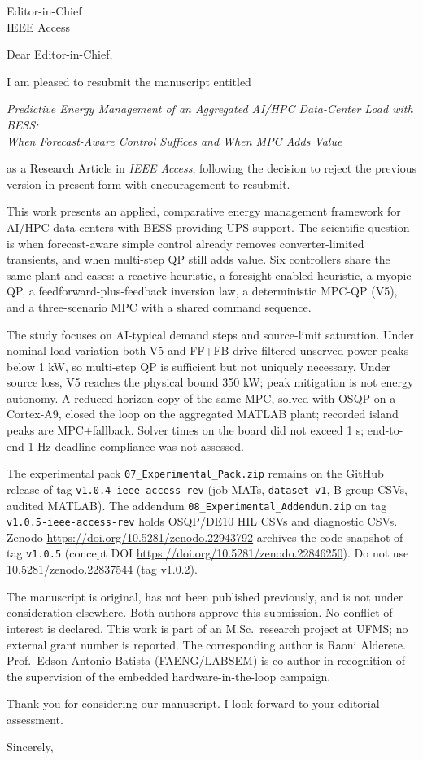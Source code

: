 \documentclass[11pt]{letter}
\date{\today}
\begin{document}
\begin{letter}{Editor-in-Chief\\
IEEE Access}

\opening{Dear Editor-in-Chief,}

I am pleased to resubmit the manuscript entitled

\begin{center}
\textit{Predictive Energy Management of an Aggregated AI/HPC Data-Center Load with BESS:\\
When Forecast-Aware Control Suffices and When MPC Adds Value}
\end{center}

as a Research Article in \textit{IEEE Access}, following the decision to reject the previous version in present form with encouragement to resubmit.

This work presents an applied, comparative energy management framework for AI/HPC data centers with BESS providing UPS support. The scientific question is when forecast-aware simple control already removes converter-limited transients, and when multi-step QP still adds value. Six controllers share the same plant and cases: a reactive heuristic, a foresight-enabled heuristic, a myopic QP, a feedforward-plus-feedback inversion law, a deterministic MPC-QP (V5), and a three-scenario MPC with a shared command sequence.

The study focuses on AI-typical demand steps and source-limit saturation. Under nominal load variation both V5 and FF+FB drive filtered unserved-power peaks below 1 kW, so multi-step QP is sufficient but not uniquely necessary. Under source loss, V5 reaches the physical bound 350 kW; peak mitigation is not energy autonomy. A reduced-horizon copy of the same MPC, solved with OSQP on a Cortex-A9, closed the loop on the aggregated MATLAB plant; recorded island peaks are MPC+fallback. Solver times on the board did not exceed 1 s; end-to-end 1 Hz deadline compliance was not assessed.

The experimental pack \texttt{07\_Experimental\_Pack.zip} remains on the GitHub release of tag \texttt{v1.0.4-ieee-access-rev} (job MATs, \texttt{dataset\_v1}, B-group CSVs, audited MATLAB). The addendum \texttt{08\_Experimental\_Addendum.zip} on tag \texttt{v1.0.5-ieee-access-rev} holds OSQP/DE10 HIL CSVs and diagnostic CSVs. Zenodo \url{https://doi.org/10.5281/zenodo.22943792} archives the code snapshot of tag \texttt{v1.0.5} (concept DOI \url{https://doi.org/10.5281/zenodo.22846250}). Do not use 10.5281/zenodo.22837544 (tag v1.0.2).

The manuscript is original, has not been published previously, and is not under consideration elsewhere. Both authors approve this submission. No conflict of interest is declared. This work is part of an M.Sc.\ research project at UFMS; no external grant number is reported. The corresponding author is Raoni Alderete. Prof.\ Edson Antonio Batista (FAENG/LABSEM) is co-author in recognition of the supervision of the embedded hardware-in-the-loop campaign.

Thank you for considering our manuscript. I look forward to your editorial assessment.

\closing{Sincerely,}

\end{letter}
\end{document}
